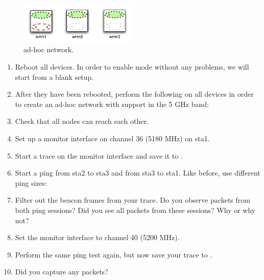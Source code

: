 \begin{exercise}{}

\begin{figure}[h]
		\begin{center}
			\includegraphics[width=0.5\textwidth]{images/adhoc2.pdf} 
			\caption{ ad-hoc network.}
			\label{fig:ad-hoc-n} 
		\end{center}
	\end{figure}


\begin{enumerate}
	\item Reboot all devices. In order to enable  mode without any problems, we will start from a blank setup.
	\item After they have been rebooted, perform the following on all devices in order to create an ad-hoc network with  support in the 5 GHz band:\newline
	\item Check that all nodes can reach each other.
	\item Set up a monitor interface on channel 36 (5180 MHz) on \ac{sta}1.
	\item Start a trace on the monitor interface and save it to .
	\item Start a ping from \ac{sta}2 to \ac{sta}3 and from \ac{sta}3 to \ac {sta}1. Like before, use different ping sizes:\newline
	\item Filter out the beacon frames from your trace. Do you observe packets from both ping sessions? Did you see all packets from these sessions? Why or why not?\newline
	\begin{esolution}
	\end{esolution}
	\item Set the monitor interface to channel 40 (5200 MHz).
	\item Perform the same ping test again, but now save your trace to .
	\item Did you capture any packets?\newline
	\begin{esolution}
	\end{esolution}
\end{enumerate}


\end{exercise}
